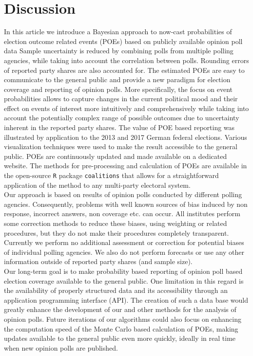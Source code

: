 \documentclass[smallcondensed]{svjour3_edited}     %
\begin{document}
\section{Discussion} \label{sec:conclusion}
In this article we introduce a Bayesian approach to now-cast probabilities of
election outcome related events (POEs) based on publicly available opinion poll data
Sample uncertainty is reduced by combining polls from multiple polling agencies,
while taking into account the correlation between polls.
Rounding errors of reported party shares are also accounted for.
The estimated POEs are easy to communicate to the general public and provide
a new paradigm for election coverage and reporting of opinion polls.
More specifically, the focus on event probabilities allows to capture
changes in the current political mood and their effect on events of interest more
intuitively and comprehensively while taking into account the potentially complex
range of possible outcomes due to uncertainty inherent in the
reported party shares. The value of POE based reporting was illustrated by
application to the 2013 and 2017 German federal elections.
Various visualization techniques were used to make the result accessible to the
general public. POEs are continuously updated and
made available on a dedicated website. The methods for pre-processing and
calculation of POEs are available in the
open-source \texttt{R} package \texttt{coalitions} that allows for a straightforward
application of the method to any multi-party electoral system.\\

Our approach is based on results of opinion polls conducted by different
polling agencies. Consequently, problems with well known sources of bias induced
by non response, incorrect answers, non coverage etc. can occur. All institutes
perform some correction methods to reduce these biases, using weighting or related
procedures, but they do not make their procedures completely transparent.
Currently we perform no additional assessment or correction for potential biases
of individual polling agencies. We also do not perform forecasts or use
any other information outside of reported party shares (and sample size).\\


Our long-term goal is to make probability based reporting of opinion poll based
election coverage available to the general public. One limitation in this regard
is the availability of properly structured data and its accessibility through
an application programming interface (API). The creation of such a data base
would greatly enhance the development of our and other methods for the analysis
of opinion polls. Future iterations of our algorithms could also focus on
enhancing  the computation speed of the Monte Carlo based calculation of
POEs, making updates available to the general public even more quickly,
ideally in real time when new opinion polls are published.
\end{document}
